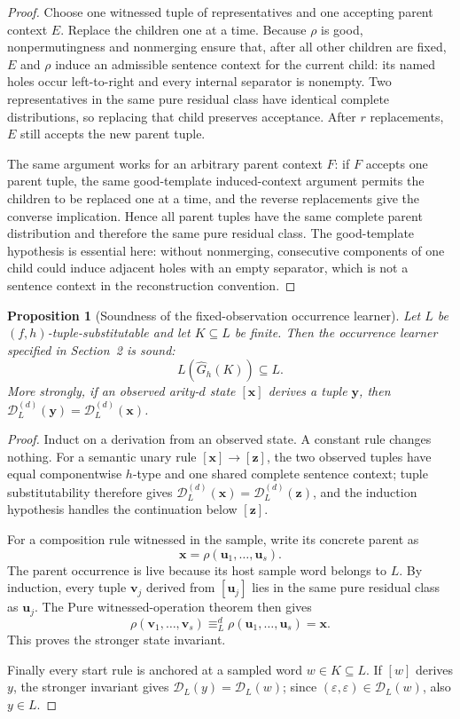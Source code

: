 \documentclass[11pt]{article}
\newtheorem{proposition}[definition]{Proposition}
\newcommand{\D}{\mathcal D}
\newcommand{\eps}{\varepsilon}
\begin{document}
\begin{proof}
Choose one witnessed tuple of representatives and one accepting parent context
$E$.  Replace the children one at a time.  Because $\rho$ is good,
nonpermutingness and nonmerging ensure that, after all other children are
fixed, $E$ and $\rho$ induce an admissible sentence context for the current
child: its named holes occur left-to-right and every internal separator is
nonempty.  Two representatives in the same pure residual class have identical
complete distributions, so replacing that child preserves acceptance.  After
$r$ replacements, $E$ still accepts the new parent tuple.

The same argument works for an arbitrary parent context $F$: if $F$ accepts
one parent tuple, the same good-template induced-context argument permits the
children to be replaced one at a time, and the reverse replacements give the
converse implication.  Hence all parent tuples have the same complete parent
distribution and therefore the same pure residual class.  The good-template
hypothesis is essential here: without nonmerging, consecutive components of
one child could induce adjacent holes with an empty separator, which is not a
sentence context in the reconstruction convention.
\end{proof}

\begin{proposition}[Soundness of the fixed-observation occurrence learner]
\label{prop:mcfg-local-soundness}
Let $L$ be $(f,h)$-tuple-substitutable and let $K\subseteq L$ be finite.
Then the occurrence learner specified in Section~2 is sound:
\[
  L(\widehat G_h(K))\subseteq L.
\]
More strongly, if an observed arity-$d$ state $[\mathbf x]$ derives a tuple
$\mathbf y$, then
$\D_L^{(d)}(\mathbf y)=\D_L^{(d)}(\mathbf x)$.
\end{proposition}

\begin{proof}
Induct on a derivation from an observed state.  A constant rule changes
nothing.  For a semantic unary rule
$[\mathbf x]\to[\mathbf z]$, the two observed tuples have equal
componentwise $h$-type and one shared complete sentence context; tuple
substitutability therefore gives
$\D_L^{(d)}(\mathbf x)=\D_L^{(d)}(\mathbf z)$, and the induction hypothesis
handles the continuation below $[\mathbf z]$.

For a composition rule witnessed in the sample, write its concrete parent as
\[
  \mathbf x=\rho(\mathbf u_1,\ldots,\mathbf u_s).
\]
The parent occurrence is live because its host sample word belongs to $L$.
By induction, every tuple $\mathbf v_j$ derived from $[\mathbf u_j]$ lies in
the same pure residual class as $\mathbf u_j$.  The
Pure witnessed-operation theorem then gives
\[
  \rho(\mathbf v_1,\ldots,\mathbf v_s)
  \equiv_L^d
  \rho(\mathbf u_1,\ldots,\mathbf u_s)=\mathbf x.
\]
This proves the stronger state invariant.

Finally every start rule is anchored at a sampled word $w\in K\subseteq L$.
If $[w]$ derives $y$, the stronger invariant gives
$\D_L(y)=\D_L(w)$; since $(\eps,\eps)\in\D_L(w)$, also $y\in L$.
\end{proof}
\end{document}
